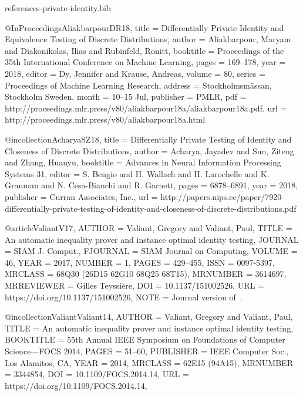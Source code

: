 \documentclass[10pt]{article}
\begin{document}
\begin{filecontents}{references-private-identity.bib}

@InProceedings{AliakbarpourDR18,
  title = 	 {Differentially Private Identity and Equivalence Testing of Discrete Distributions},
  author = 	 {Aliakbarpour, Maryam and Diakonikolas, Ilias and Rubinfeld, Ronitt},
  booktitle = 	 {Proceedings of the 35th International Conference on Machine Learning},
  pages = 	 {169--178},
  year = 	 {2018},
  editor = 	 {Dy, Jennifer and Krause, Andreas},
  volume = 	 {80},
  series = 	 {Proceedings of Machine Learning Research},
  address = 	 {Stockholmsmässan, Stockholm Sweden},
  month = 	 {10--15 Jul},
  publisher = 	 {PMLR},
  pdf = 	 {http://proceedings.mlr.press/v80/aliakbarpour18a/aliakbarpour18a.pdf},
  url = 	 {http://proceedings.mlr.press/v80/aliakbarpour18a.html}
}

@incollection{AcharyaSZ18,
  title = {Differentially Private Testing of Identity and Closeness of Discrete Distributions},
  author = {Acharya, Jayadev and Sun, Ziteng and Zhang, Huanyu},
  booktitle = {Advances in Neural Information Processing Systems 31},
  editor = {S. Bengio and H. Wallach and H. Larochelle and K. Grauman and N. Cesa-Bianchi and R. Garnett},
  pages = {6878--6891},
  year = {2018},
  publisher = {Curran Associates, Inc.},
  url = {http://papers.nips.cc/paper/7920-differentially-private-testing-of-identity-and-closeness-of-discrete-distributions.pdf}
}

@article{ValiantV17,
    AUTHOR = {Valiant, Gregory and Valiant, Paul},
     TITLE = {An automatic inequality prover and instance optimal identity
              testing},
   JOURNAL = {SIAM J. Comput.},
  FJOURNAL = {SIAM Journal on Computing},
    VOLUME = {46},
      YEAR = {2017},
    NUMBER = {1},
     PAGES = {429--455},
      ISSN = {0097-5397},
   MRCLASS = {68Q30 (26D15 62G10 68Q25 68T15)},
  MRNUMBER = {3614697},
MRREVIEWER = {Gilles Teyssi\`ere},
       DOI = {10.1137/151002526},
       URL = {https://doi.org/10.1137/151002526},
      NOTE = {Journal version of~\cite{ValiantValiant14}.}
}

@incollection{ValiantValiant14,
    AUTHOR = {Valiant, Gregory and Valiant, Paul},
     TITLE = {An automatic inequality prover and instance optimal identity
              testing},
 BOOKTITLE = {55th {A}nnual {IEEE} {S}ymposium on {F}oundations of
              {C}omputer {S}cience---{FOCS} 2014},
     PAGES = {51--60},
 PUBLISHER = {IEEE Computer Soc., Los Alamitos, CA},
      YEAR = {2014},
   MRCLASS = {62E15 (94A15)},
  MRNUMBER = {3344854},
       DOI = {10.1109/FOCS.2014.14},
       URL = {https://doi.org/10.1109/FOCS.2014.14},
}


\end{filecontents}
\end{document}
